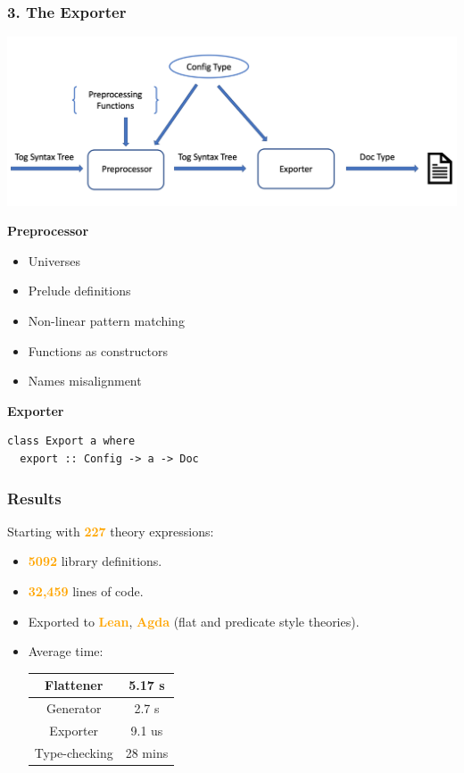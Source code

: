 \documentclass[t,10pt,numbers,fleqn,usenames,xcolor=dvipsnames]{beamer}
\begin{document}
\begin{frame}[fragile] 
\frametitle{3. The Exporter} 
\includegraphics[scale=0.2]{../figures/exporter_arch.png}
\begin{overprint}
\textbf{Preprocessor}
\begin{itemize}
\item Universes 
\item Prelude definitions 
\item Non-linear pattern matching 
\item Functions as constructors
\item Names misalignment  
\end{itemize}
\textbf{Exporter}
\begin{verbatim} 
class Export a where
  export :: Config -> a -> Doc
\end{verbatim} 
\end{overprint}
\end{frame}

\begin{frame}[fragile] 
\frametitle{Results}
Starting with \textbf{\textcolor{Orange}{227}} theory expressions:
\begin{itemize}
\item \textcolor{Orange}{\textbf{5092}} library definitions. 
\item \textcolor{Orange}{\textbf{32,459}} lines of code. 
\item Exported to \textcolor{Orange}{\textbf{Lean}}, \textcolor{Orange}{\textbf{Agda}} (flat and predicate style theories).
\pause
\item Average time: \\ \vspace{0.25cm}
\begin{center}
\begin{adjustbox}{width=0.4\columnwidth}
\begin{tabular}{| c | c |}\hline
Flattener & 5.17 s \\ \hline
Generator & 2.7 s \\ \hline
Exporter & 9.1 us \\ \hline
Type-checking & 28 mins \\ \hline
\end{tabular}
\end{adjustbox}
\end{center}
\end{itemize}
\end{frame}
\end{document}
